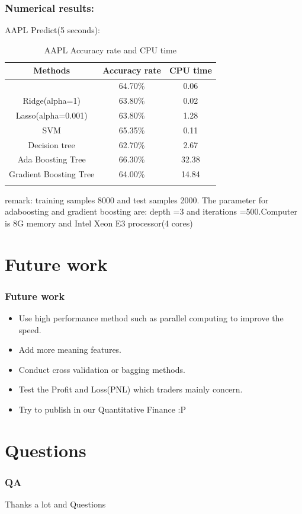 \documentclass[xcolor={x11names,svgnames,dvipsnames}]{beamer}
\begin{document}
\begin{frame}
\frametitle{Numerical results:}
\begin{block}{AAPL Predict(5 seconds):}
\begin{table}[h!]\small
  \caption{AAPL Accuracy rate and CPU time}
\begin{center}
    \begin{tabular}{| c | c|c|}
    \hline
    Methods& Accuracy rate& CPU time \\
    \hline\small{
Logistic&64.70\%	&0.06\\
Ridge(alpha=1)& 63.80\%	&0.02\\
Lasso(alpha=0.001)&63.80\%	&1.28\\
SVM&65.35\%	&0.11\\
Decision tree &	62.70\%	&2.67\\
Ada Boosting Tree&	66.30\%&	32.38\\
Gradient Boosting Tree&	64.00\%	&14.84\\
}
\hline
\end{tabular}
\end{center}
\end{table}
\end{block}
\small{remark: \alert{training samples 8000 and test samples 2000}. The parameter for adaboosting and gradient boosting are: \alert{depth =3 and iterations =500}.Computer is 8G memory and Intel Xeon E3 processor(4 cores)}
\end{frame}


\section{Future work}
\begin{frame}
\frametitle{Future work}
    \begin{itemize}
        \item  Use high performance method such as parallel computing to improve the speed.
        \item  Add more meaning features.
        \item  Conduct cross validation or bagging methods.
        \item  Test the Profit and Loss(PNL) which traders mainly concern.
        \item  Try to publish in our Quantitative Finance :P
      \end{itemize}
\end{frame}

\section{Questions}

\begin{frame}
\frametitle{QA}
\begin{center}
\huge{Thanks a lot and Questions}
\end{center}
\end{frame}
\end{document}
